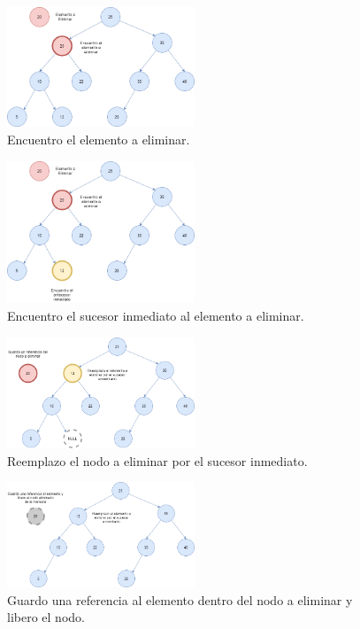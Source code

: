 \documentclass[titlepage,a4paper]{article}
\begin{document}
\begin{figure}[H]
\centering
\includegraphics[width=0.5\textwidth]{eliminacion_4.png}
\caption{\label{fig:seq11}Encuentro el elemento a eliminar.}
\end{figure}

\begin{figure}[H]
\centering
\includegraphics[width=0.5\textwidth]{eliminacion_5.png}
\caption{\label{fig:seq12}Encuentro el sucesor inmediato al elemento a eliminar.}
\end{figure}

\begin{figure}[H]
\centering
\includegraphics[width=0.5\textwidth]{eliminacion_6.png}
\caption{\label{fig:seq13}Reemplazo el nodo a eliminar por el sucesor inmediato.}
\end{figure}

\begin{figure}[H]
\centering
\includegraphics[width=0.5\textwidth]{eliminacion_7.png}
\caption{\label{fig:seq14}Guardo una referencia al elemento dentro del nodo a eliminar y libero el nodo.}
\end{figure}
\end{document}
